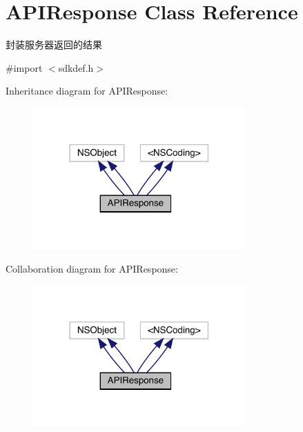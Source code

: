 \hypertarget{interface_a_p_i_response}{}\section{A\+P\+I\+Response Class Reference}
\label{interface_a_p_i_response}


封装服务器返回的结果  




{\ttfamily \#import $<$sdkdef.\+h$>$}



Inheritance diagram for A\+P\+I\+Response\+:\nopagebreak
\begin{figure}[H]
\begin{center}
\leavevmode
\includegraphics[width=230pt]{interface_a_p_i_response__inherit__graph}
\end{center}
\end{figure}


Collaboration diagram for A\+P\+I\+Response\+:\nopagebreak
\begin{figure}[H]
\begin{center}
\leavevmode
\includegraphics[width=230pt]{interface_a_p_i_response__coll__graph}
\end{center}
\end{figure}
